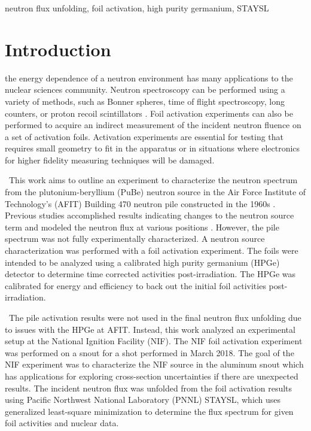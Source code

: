 \documentclass[journal]{IEEEtran}
\begin{document}
	\begin{IEEEkeywords}
		neutron flux unfolding, foil activation, high purity germanium, STAYSL 
	\end{IEEEkeywords}
	
	\IEEEpeerreviewmaketitle
	
\section{Introduction}
 the energy dependence of a neutron environment has many applications to the nuclear sciences community. 
Neutron spectroscopy can be performed using a variety of methods, such as Bonner spheres, time of flight spectroscopy, long counters, or proton recoil scintillators \cite{Knoll}. Foil activation experiments can also be performed to acquire an indirect measurement of the incident neutron fluence on a set of activation foils. Activation experiments are essential for testing that requires small geometry to fit in the apparatus or in situations where electronics for higher fidelity measuring techniques will be damaged. 

\ This work aims to outline an experiment to characterize the neutron spectrum from the plutonium-beryllium (PuBe) neutron source in the Air Force Institute of Technology's (AFIT) Building 470 neutron pile constructed in the 1960s \cite{NETF}. Previous studies accomplished results indicating changes to the neutron source term and modeled the neutron flux at various positions \cite{Bevins,Will}. However, the pile spectrum was not fully experimentally characterized. A neutron source characterization was performed with a foil activation experiment. The foils were intended to be analyzed using a calibrated high purity germanium (HPGe) detector to determine time corrected activities post-irradiation. The HPGe was calibrated for energy and efficiency to back out the initial foil activities post-irradiation. 

\ The pile activation results were not used in the final neutron flux unfolding due to issues with the HPGe at AFIT. Instead, this work analyzed an experimental setup at the National Ignition Facility (NIF). The NIF foil activation experiment was performed on a snout for a shot performed in March 2018\cite{Bogetic}. The goal of the NIF experiment was to characterize the NIF source in the aluminum snout which has applications for exploring cross-section uncertainties if there are unexpected results. The incident neutron flux was unfolded from the foil activation results using Pacific Northwest National Laboratory (PNNL) STAYSL, which uses generalized least-square minimization to determine the flux spectrum for given foil activities and nuclear data\cite{STAYSL}.
\end{document}
